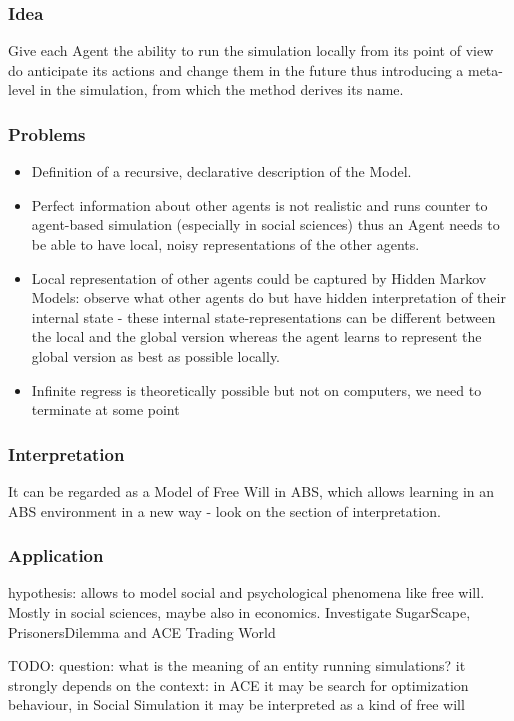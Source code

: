 \subsubsection{Idea} Give each  Agent the ability to run the simulation locally from its point of view do anticipate its actions and change them in the future thus introducing a meta-level in the simulation, from which the method derives its name.
\subsubsection{Problems} 
\begin{itemize}
	\item Definition of a recursive, declarative description of the Model.
	\item Perfect information about other agents is not realistic and runs counter to agent-based simulation (especially in social sciences) thus an Agent needs to be able to have local, noisy representations of the other agents.
	\item Local representation of other agents could be captured by Hidden Markov Models: observe what other agents do but have hidden interpretation of their internal state - these internal state-representations can be different between the local and the global version whereas the agent learns to represent the global version as best as possible locally.
	\item Infinite regress is theoretically possible but not on computers, we need to terminate at some point
\end{itemize}

\subsubsection{Interpretation} It can be regarded as a Model of Free Will in ABS, which allows learning in an ABS environment in a new way - look on the section of interpretation.
\subsubsection{Application} hypothesis: allows to model social and psychological phenomena like free will. Mostly in social sciences, maybe also in economics. Investigate SugarScape, PrisonersDilemma and ACE Trading World

TODO: question: what is the meaning of an entity running simulations? it strongly depends on the context: in ACE it may be search for optimization behaviour, in Social Simulation it may be interpreted as a kind of free will

